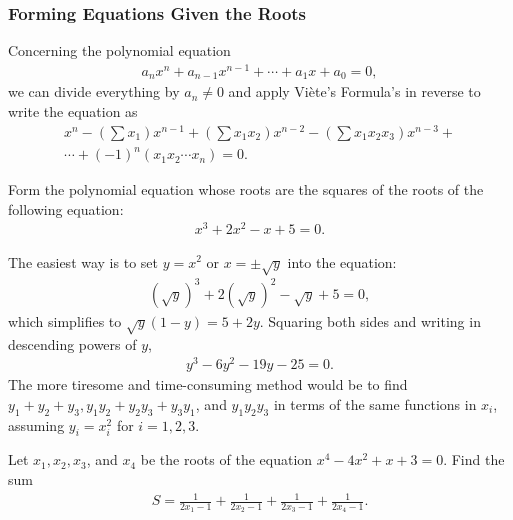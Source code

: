 \subsubsection{Forming Equations Given the Roots}

\begin{tcolorbox}[title={Forming Equations A.K.A. Reverse Viète}]
    \begin{question}
        Concerning the polynomial equation
        \begin{align*}
            a_nx^n+a_{n-1}x^{n-1} + \cdots + a_1x + a_0 = 0,
        \end{align*}
        we can divide everything by $a_n\neq 0$ and apply Viète's Formula's in reverse to write the equation as
        \begin{multline*}
            x^n - \left(\sum x_1\right) x^{n-1} + \left(\sum x_1x_2\right) x^{n-2} - \left(\sum x_1x_2x_3\right)x^{n-3} +\\ \cdots + (-1)^n (x_1x_2\cdots x_n)=0.
        \end{multline*}
    \end{question}
\end{tcolorbox}

\begin{question}
    Form the polynomial equation whose roots are the squares of the roots of the following equation:
    \begin{align*}
        x^3+2x^2-x+5=0.
    \end{align*}
\end{question}

\begin{solution}
    The easiest way is to set $y=x^2$ or $x=\pm \sqrt{y}$ into the equation:
    \begin{align*}
        (\sqrt{y})^3+2(\sqrt{y})^2-\sqrt{y}+5=0,
    \end{align*}
    which simplifies to $\sqrt{y}(1-y) = 5+2y$. Squaring both sides and writing in descending powers of $y$,
    \begin{align*}
        y^3-6y^2-19y-25=0.
    \end{align*}
    The more tiresome and time-consuming method would be to find $y_1+y_2+y_3, y_1y_2+y_2y_3+y_3y_1$, and $y_1y_2y_3$ in terms of the same functions in $x_i$, assuming $y_i=x_i^2$ for $i=1,2,3$. 
\end{solution}



\begin{question}
    Let $x_1,x_2,x_3$, and $x_4$ be the roots of the equation $x^4-4x^2+x+3=0$. Find the sum
    \begin{align*}
        S = \frac{1}{2x_1-1}+\frac{1}{2x_2-1}+\frac{1}{2x_3-1}+\frac{1}{2x_4-1}.
    \end{align*}
\end{question}

